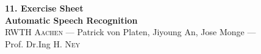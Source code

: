 \documentclass[12pt,oneside,a4paper]{article}
\begin{document}
\begin{center}
{\LARGE \bfseries 
 11. Exercise Sheet  \\[0.1cm] 
}
{ \large \bfseries
 Automatic Speech Recognition \\[0.3cm] %
}
{\large
  \textsc{RWTH Aachen} --- Patrick von Platen, Jiyoung An, Jose Monge ---\\[0.3cm]
}
{\normalsize
  Prof. Dr.Ing H. \textsc{Ney} \\[0.92cm] %
}
\end{center}
 
 

\end{document}
